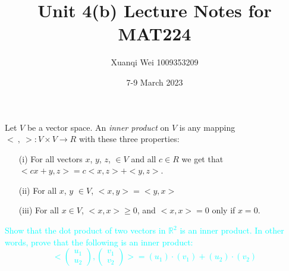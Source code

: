 \documentclass[fontsize=12pt]{scrartcl}
\title{Unit 4(b) Lecture Notes for MAT224}
\author{Xuanqi Wei 1009353209}
\date{7-9 March 2023}
\begin{document}
\maketitle

\newpage


\noindent
Let $V$ be a vector space. An \textit{inner product} on $V$ is any mapping $<\ , \ >: V \times V \to R$ with these three properties:\\
\begin{itemize}
    \item[(i)] For all vectors $x$, $y$, $z$, $\in V$ and all $c \in R$ we get that $< cx + y, z> = c<x,z> + <y,z>$.

    \item[(ii)] For all $x$, $y$ $\in V$, $<x, y> = <y,x>$

    \item[(iii)] For all $x \in V$, $<x,x> \geq 0$, and $<x,x> = 0$ only if $x = 0$.
\end{itemize}

\bigskip

\noindent
\textcolor{cyan}{Show that the dot product of two vectors in $\mathbb{R}^2$ is an inner product. In other words, prove that the following is an inner product: $$\big<\left( \begin{array}{c} u_1 \\ u_2 \end{array}\right), \left( \begin{array}{c} v_1 \\ v_2 \end{array} \right)\big> = (u_1) \cdot (v_1) + (u_2) \cdot (v_2)$$}
\end{document}
